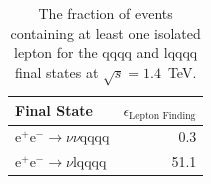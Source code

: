 \begin{table}[h!]
\centering
\begin{tabular}{ l r }
\hline
Final State & $\epsilon_{\text{Lepton Finding}}$ \\ 
\hline
$\text{e}^{+}\text{e}^{-} \rightarrow \nu{\nu}\text{qqqq}$ & 0.3 \\
$\text{e}^{+}\text{e}^{-} \rightarrow \nu\text{lqqqq}$ & 51.1 \\
\hline
\end{tabular}
\caption[The fraction of events {containing at least one isolated lepton} for the {\nu}{\nu}qqqq and {\nu}lqqqq final states at $\sqrt{s}=1.4$~TeV.]{The fraction of events {containing at least one isolated lepton} for the {\nu}{\nu}qqqq and {\nu}lqqqq final states at $\sqrt{s}=1.4$~TeV.}
\label{table:efficiencyleptonfinding}
\end{table}


